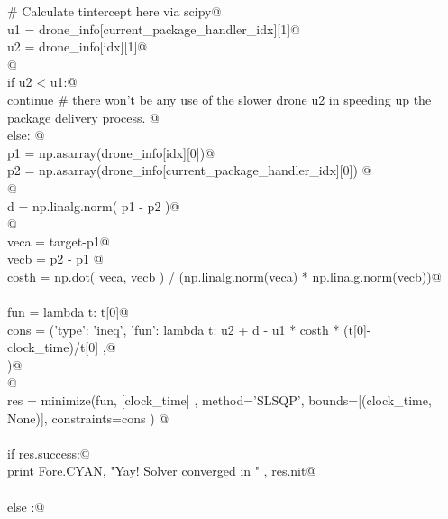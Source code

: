 \documentclass[12.0pt]{report}
\begin{document}
\begin{flushleft}
\begin{list}{}{}
\mbox{}\verb@              # Calculate tintercept here via scipy@\\
\mbox{}\verb@              u1 = drone_info[current_package_handler_idx][1]@\\
\mbox{}\verb@              u2 = drone_info[idx][1]@\\
\mbox{}\verb@    @\\
\mbox{}\verb@              if u2 < u1:@\\
\mbox{}\verb@                  continue # there won't be any use of the slower drone u2 in speeding up the package delivery process. @\\
\mbox{}\verb@              else: @\\
\mbox{}\verb@                p1 = np.asarray(drone_info[idx][0])@\\
\mbox{}\verb@                p2 = np.asarray(drone_info[current_package_handler_idx][0]) @\\
\mbox{}\verb@           @\\
\mbox{}\verb@                d  = np.linalg.norm( p1 - p2 )@\\
\mbox{}\verb@    @\\
\mbox{}\verb@                veca  = target-p1@\\
\mbox{}\verb@                vecb  = p2 - p1  @\\
\mbox{}\verb@                costh = np.dot( veca, vecb ) / (np.linalg.norm(veca) * np.linalg.norm(vecb))@\\
\mbox{}\verb@@\\
\mbox{}\verb@                fun    = lambda t: t[0]@\\
\mbox{}\verb@                cons   = ({'type': 'ineq', 'fun': lambda t:  u2 + d - u1 * costh * (t[0]-clock_time)/t[0] },@\\
\mbox{})@\\
\mbox{}\verb@    @\\
\mbox{}\verb@                res = minimize(fun, [clock_time] , method='SLSQP', bounds=[(clock_time, None)], constraints=cons ) @\\
\mbox{}\verb@@\\
\mbox{}\verb@                if res.success:@\\
\mbox{}\verb@                      print Fore.CYAN, "Yay! Solver converged in "      , res.nit@\\
\mbox{}\verb@@\\
\mbox{}\verb@                else :@\\

\end{list}
\end{flushleft}
\end{document}

